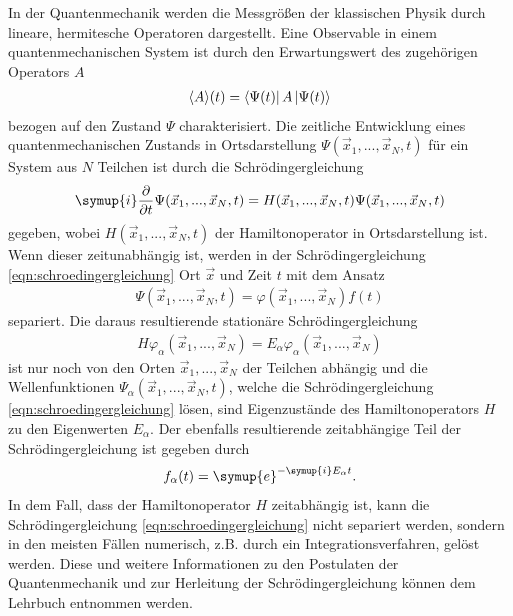 In der Quantenmechanik werden die Messgrößen der klassischen Physik durch lineare, hermitesche Operatoren dargestellt.
Eine Observable in einem quantenmechanischen System ist durch den Erwartungswert des zugehörigen Operators $A$
\begin{align}
  \langle A \rangle (t) = \bra{\Psi(t)} A \ket{\Psi(t)}
\end{align}
bezogen auf den Zustand $\Psi$ charakterisiert.
Die zeitliche Entwicklung eines quantenmechanischen Zustands in Ortsdarstellung $\Psi(\vec{x}_1,...,\vec{x}_N,t)$ für ein System aus $N$ Teilchen ist durch die Schrödingergleichung
\begin{align}
  \symup{i} \frac{\partial}{\partial t} \Psi(\vec{x}_1,...,\vec{x}_N,t) = H(\vec{x}_1,...,\vec{x}_N,t) \Psi(\vec{x}_1,...,\vec{x}_N,t)
  \label{eqn:schroedingergleichung}
\end{align}
gegeben, wobei $H(\vec{x}_1,...,\vec{x}_N,t)$ der Hamiltonoperator in Ortsdarstellung ist.
Wenn dieser zeitunabhängig ist, werden in der Schrödingergleichung \eqref{eqn:schroedingergleichung} Ort $\vec{x}$ und Zeit $t$ mit dem Ansatz
\begin{align*}
  \Psi(\vec{x}_1,...,\vec{x}_N,t) = \varphi(\vec{x}_1,...,\vec{x}_N)f(t)
\end{align*}
separiert. Die daraus resultierende stationäre Schrödingergleichung
\begin{align}
  H \varphi_\alpha(\vec{x}_1,...,\vec{x}_N) = E_\alpha \varphi_\alpha(\vec{x}_1,...,\vec{x}_N)
  \label{eqn:statschroedinger}
\end{align}
ist nur noch von den Orten $\vec{x}_1,...,\vec{x}_N$ der Teilchen abhängig und die Wellenfunktionen $\Psi_\alpha(\vec{x}_1,...,\vec{x}_N,t)$, welche die Schrödingergleichung \eqref{eqn:schroedingergleichung} lösen, sind Eigenzustände des Hamiltonoperators $H$ zu den Eigenwerten $E_\alpha$.
Der ebenfalls resultierende zeitabhängige Teil der Schrödingergleichung ist gegeben durch
\begin{align}
  f_\alpha(t) = \symup{e}^{-\symup{i} E_\alpha t}.
\end{align}
In dem Fall, dass der Hamiltonoperator $H$ zeitabhängig ist, kann die Schrödingergleichung \eqref{eqn:schroedingergleichung} nicht separiert werden, sondern in den meisten Fällen numerisch, z.B. durch ein Integrationsverfahren, gelöst werden.
Diese und weitere Informationen zu den Postulaten der Quantenmechanik und zur Herleitung der Schrödingergleichung können dem Lehrbuch \cite{schwabl} entnommen werden.


